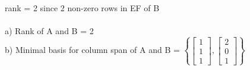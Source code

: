 \documentclass{article}
\begin{document}
\begin{aprob}
\begin{tcolorbox}[colback=lightgray!10!white, colframe=black, title=A5]
    \vspace{1em} \\
    rank = 2 since 2 non-zero rows in EF of B \\
    \vspace{1em} \\
    a) Rank of A and B = 2 \\
    b) Minimal basis for column span of A and B = 
    $\left\{\begin{bmatrix} 1 \\ 1 \\ 1 \end{bmatrix}, \begin{bmatrix} 2 \\ 0 \\ 1 \end{bmatrix}\right\}$
    \end{tcolorbox}
\end{aprob}
\end{document}
